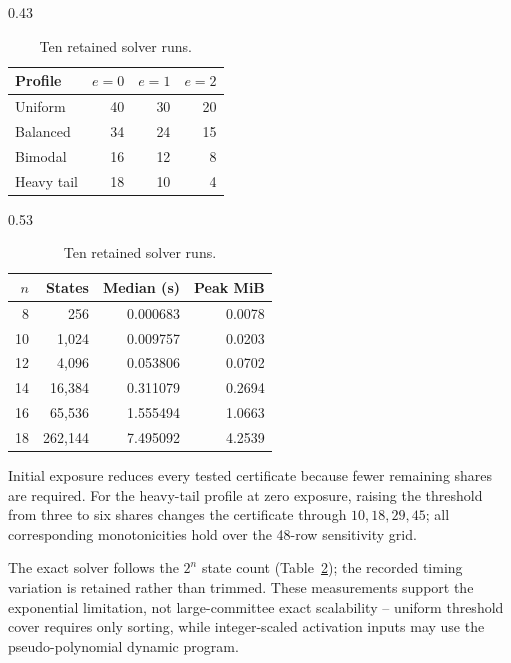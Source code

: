 \begin{table}[!htbp]
\centering
\captionsetup{font=scriptsize,skip=2pt}
\fontsize{7}{7.5}\selectfont
\setlength{\tabcolsep}{3pt}
\renewcommand{\arraystretch}{0.95}
\caption{Lower-tail sensitivity and exact-solver scaling.}
\label{tab:sensitivity-scaling-detail}
\begin{subtable}[t]{0.43\linewidth}
\centering
\caption{Four-of-seven certificate.}
\label{tab:lower-tail-panel}
\begin{tabular}{@{}lrrr@{}}
\toprule
Profile & \(e=0\) & \(e=1\) & \(e=2\)\\
\midrule
Uniform & 40 & 30 & 20\\
Balanced & 34 & 24 & 15\\
Bimodal & 16 & 12 & 8\\
Heavy tail & 18 & 10 & 4\\
\bottomrule
\end{tabular}
\end{subtable}
\hfill
\begin{subtable}[t]{0.53\linewidth}
\centering
\caption{Ten retained solver runs.}
\label{tab:exact-solver-panel}
\begin{tabular}{@{}rrrr@{}}
\toprule
\(n\) & States & Median (s) & Peak MiB\\
\midrule
8  & 256     & 0.000683 & 0.0078\\
10 & 1,024   & 0.009757 & 0.0203\\
12 & 4,096   & 0.053806 & 0.0702\\
14 & 16,384  & 0.311079 & 0.2694\\
16 & 65,536  & 1.555494 & 1.0663\\
18 & 262,144 & 7.495092 & 4.2539\\
\bottomrule
\end{tabular}
\end{subtable}
\end{table}

Initial exposure reduces every tested certificate because fewer remaining
shares are required. For the heavy-tail profile at zero exposure, raising the
threshold from three to six shares changes the certificate through
\(10,18,29,45\); all corresponding monotonicities hold over the 48-row
sensitivity grid.

The exact solver follows the \(2^n\) state count
(Table~\ref{tab:exact-solver-panel}); the recorded timing variation is
retained rather than trimmed. These measurements support the exponential
limitation, not large-committee exact scalability -- uniform threshold cover
requires only sorting, while integer-scaled activation inputs may use the
pseudo-polynomial dynamic program.

